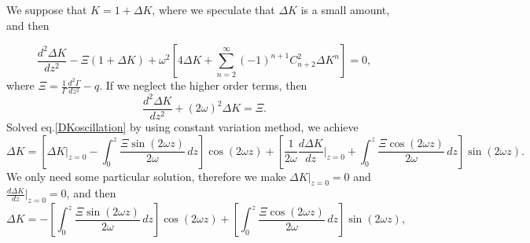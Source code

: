 \documentclass[
 jor,
 amsmath,amssymb,preprint,
]{revtex4-2}
\begin{document}
We suppose that $K=1+\Delta K$, where we speculate that $\Delta K$ is a small amount, and then
\begin{comment}
\begin{equation}
    \frac{d^2 \Delta K}{d z^2}-\left(\frac{1}{\Gamma}\frac{d^2\Gamma}{d z^2}-q\right)(1+\Delta K)+\omega^2(1+\Delta K)\sum_{n=1}^{\infty}(-1)^{n+1}\frac{(n+3)!}{n!3!}{(\Delta K)}^n=0.
\end{equation}
\end{comment}
\begin{comment}
\begin{equation}
    \frac{d^2 \Delta K}{d z^2}-\left(\frac{1}{\Gamma}\frac{d^2\Gamma}{d z^2}-q\right)(1+\Delta K)+\omega^2(1+\Delta K)\sum_{n=0}^{\infty}(-1)^{n+1}C^3_{n+3}{(\Delta K)}^n=0,
\end{equation}
\end{comment}
\begin{comment}
\begin{equation}
    \frac{d^2 \Delta K}{d z^2}-\left(\frac{1}{\Gamma}\frac{d^2\Gamma}{d z^2}-q\right)(1+\Delta K)+\omega^2[4\Delta K+\sum_{n=1}^{\infty}((-1)^{n+1}(C^3_{n+3}-C^3_{n+4})){(\Delta K)}^{n+1}]=0.
\end{equation}
\end{comment}
\begin{equation}
    \frac{d^2 \Delta K}{d z^2}-\Xi(1+\Delta K)+\omega^2\left[4\Delta K+\sum_{n=2}^{\infty}(-1)^{n+1}C^2_{n+2}{\Delta K}^{n}\right]=0,
\end{equation}
where $\Xi=\frac{1}{\Gamma}\frac{d^2\Gamma}{d z^2}-q$. 
If we neglect the higher order terms, then
\begin{equation}\label{DKoscillation}
    \frac{d^2 \Delta K}{d z^2}+(2\omega)^2\Delta K=\Xi.
\end{equation}
Solved eq.\eqref{DKoscillation} by using constant variation method, we achieve
\begin{equation}
    \Delta K=\left[\Delta K|_{z=0}-\int_{0}^z\frac{\Xi\sin(2\omega z)}{2\omega}\,d z\right]\cos(2\omega z)+\left[\frac{1}{2\omega}\frac{d \Delta K}{d z}|_{z=0}+\int_{0}^z\frac{\Xi\cos(2\omega z)}{2\omega}\,d z\right]\sin(2\omega z).
\end{equation}
We only need some particular solution, therefore we make $\Delta K|_{z=0}=0$ and $\frac{d \Delta K}{d z}|_{z=0}=0$, and then
\begin{equation}
    \Delta K=-\left[\int_{0}^z\frac{\Xi\sin(2\omega z)}{2\omega}\,d z\right]\cos(2\omega z)+\left[\int_{0}^z\frac{\Xi\cos(2\omega z)}{2\omega}\,d z\right]\sin(2\omega z),
\end{equation}
\end{document}
